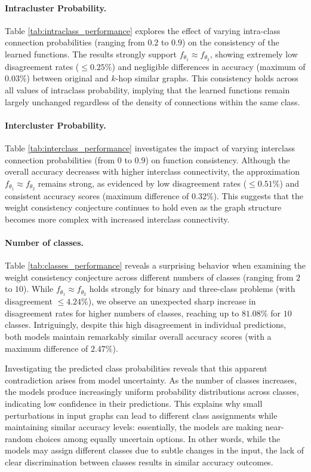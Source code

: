 \paragraph{Intracluster Probability.}

Table \ref{tab:intraclass_performance} explores the effect of varying intra-class connection probabilities (ranging from $0.2$ to $0.9$) on the consistency of the learned functions. The results strongly support $ f_{\theta_1} \approx f_{\theta_2} $, showing extremely low disagreement rates ($\leq 0.25\%$) and negligible differences in accuracy (maximum of $0.03\%$) between original and $k$-hop similar graphs. This consistency holds across all values of intraclass probability, implying that the learned functions remain largely unchanged regardless of the density of connections within the same class.



\paragraph{Intercluster Probability.}
Table \ref{tab:interclass_performance} investigates the impact of varying interclass connection probabilities (from $0$ to $0.9$) on function consistency. Although the overall accuracy decreases with higher interclass connectivity, the approximation $ f_{\theta_1} \approx f_{\theta_2} $ remains strong, as evidenced by low disagreement rates ($\leq 0.51\%$) and consistent accuracy scores (maximum difference of $0.32\%$). This suggests that the weight consistency conjecture continues to hold even as the graph structure becomes more complex with increased interclass connectivity.


\paragraph{Number of classes.}
Table \ref{tab:classes_performance} reveals a surprising behavior when examining the weight consistency conjecture across different numbers of classes (ranging from $2$ to $10$). While \( f_{\theta_1} \approx f_{\theta_2} \) holds strongly for binary and three-class problems (with disagreement \(\leq 4.24\%\)), we observe an unexpected sharp increase in disagreement rates for higher numbers of classes, reaching up to $81.08\%$ for $10$ classes. Intriguingly, despite this high disagreement in individual predictions, both models maintain remarkably similar overall accuracy scores (with a maximum difference of $2.47\%$).

Investigating the predicted class probabilities reveals that this apparent contradiction arises from model uncertainty. As the number of classes increases, the models produce increasingly uniform probability distributions across classes, indicating low confidence in their predictions. This explains why small perturbations in input graphs can lead to different class assignments while maintaining similar accuracy levels: essentially, the models are making near-random choices among equally uncertain options. In other words, while the models may assign different classes due to subtle changes in the input, the lack of clear discrimination between classes results in similar accuracy outcomes. 

